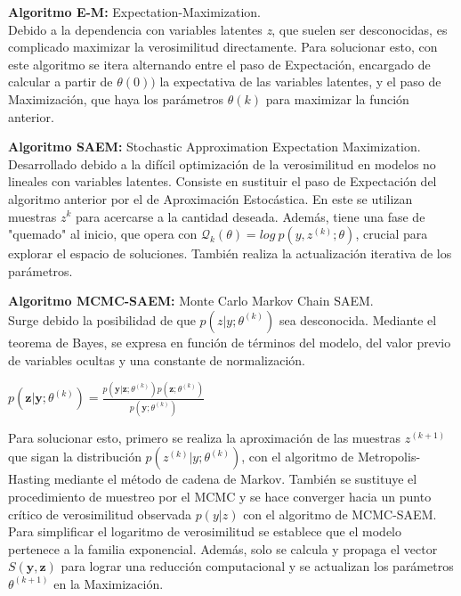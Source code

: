 	\begin{description}
		\item {\textbf{Algoritmo E-M: }}Expectation-Maximization.\\
		Debido a la dependencia con variables latentes \textit{z}, que suelen ser desconocidas, es complicado maximizar la verosimilitud directamente. Para solucionar esto, con este algoritmo se itera alternando entre el paso de Expectación, encargado de calcular a partir de $\theta(0))$  la expectativa de las variables latentes, y el paso de Maximización, que haya los parámetros $\theta(k)$ para maximizar la función anterior.
		
		\item {\textbf{Algoritmo SAEM: }}Stochastic Approximation Expectation Maximization.\\
		Desarrollado debido a la difícil optimización de la verosimilitud en modelos no lineales con variables latentes. Consiste en sustituir el paso de Expectación del algoritmo anterior por el de Aproximación Estocástica. En este se utilizan muestras $z^{k}$ para acercarse a la cantidad deseada. Además, tiene una fase de "quemado" al inicio, que opera con $\mathcal{Q}_{k}(\theta)=log\ p(y,z^{(k)};\theta)$, crucial para explorar el espacio de soluciones. También realiza la actualización iterativa de los parámetros.
		
		\item {\textbf{Algoritmo MCMC-SAEM: }}Monte Carlo Markov Chain SAEM.\\
		Surge debido la posibilidad de que $p(z|y;\theta^{(k)})$ sea desconocida. Mediante el teorema de Bayes, se expresa en función de términos del modelo, del valor previo de variables ocultas y una constante de normalización.
		\begin{center}
			$p(\mathbf{z}|\mathbf{y};\theta^{(k)})=\frac{p(\mathbf{y}|\mathbf{z};\theta^{(k)})p(\mathbf{z};\theta^{(k)})}{p(\mathbf{y};\theta^{(k)})}$
		\end{center}
		Para solucionar esto, primero se realiza la aproximación de las muestras $z^{(k+1)}$  que sigan la distribución $p(z^{(k)}|y;\theta^{(k)})$, con el algoritmo de Metropolis-Hasting mediante el método de cadena de Markov. También se sustituye el procedimiento de muestreo por el MCMC y se hace converger hacia un punto crítico de verosimilitud observada $p(y|z)$ con el algoritmo de MCMC-SAEM. Para simplificar el logaritmo de verosimilitud se establece que el modelo pertenece a la familia exponencial. Además, solo se calcula y propaga el vector $\mathit{S}(\mathbf{y},\mathbf{z})$ para lograr una reducción computacional y se actualizan los parámetros $\theta^{(k+1)}$ en la Maximización. \cite[Capítulo 2]{koval2020learning}
		

\end{description}
